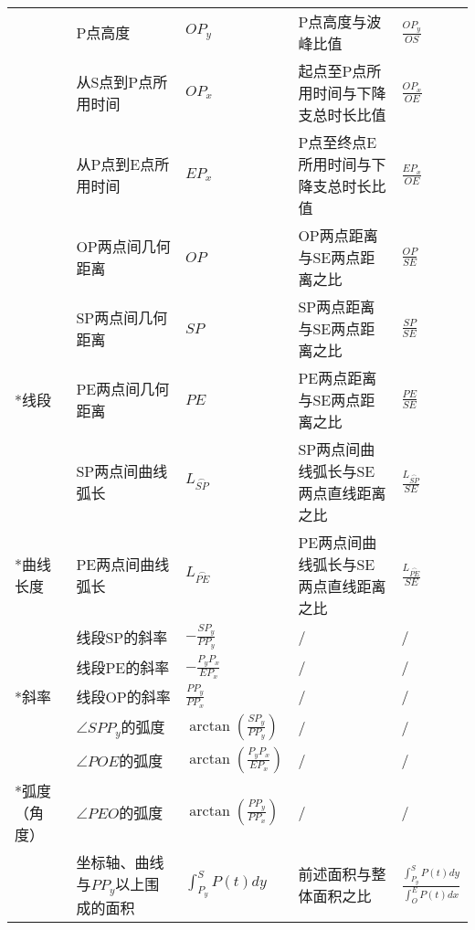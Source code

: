 \begin{center}
\begin{longtable}{m{1.57cm}<{\centering}m{4.07cm}<{\centering}m{2.07cm}<{\centering}m{4.07cm}<{\centering}m{2.67cm}<{\centering}}
                                     & P点高度                  &   $OP_y$       &    P点高度与波峰比值   & $\frac{OP_y}{OS}$ \\
                                     & 从S点到P点所用时间        &    $OP_x$   &      起点至P点所用时间与下降支总时长比值 & $\frac{OP_x}{OE}$ \\
                                     & 从P点到E点所用时间        &    $EP_x$   &      P点至终点E所用时间与下降支总时长比值 & $\frac{EP_x}{OE}$ \\
                                     & OP两点间几何距离        &    $OP$   &  OP两点距离与SE两点距离之比     & $\frac{OP}{SE}$ \\
                                     & SP两点间几何距离        &    $SP$   &  SP两点距离与SE两点距离之比     & $\frac{SP}{SE}$ \\
         \multirow{-7}*{线段}         & PE两点间几何距离        &    $PE$   &  PE两点距离与SE两点距离之比     & $\frac{PE}{SE}$ \\
                                     &  SP两点间曲线弧长     &  $L_{\overset{\frown}{SP}}$     &     SP两点间曲线弧长与SE两点直线距离之比  & $\frac{L_{\overset{\frown}{SP}}}{SE}$ \\
         \multirow{-2}*{曲线长度} &  PE两点间曲线弧长   &   $L_{\overset{\frown}{PE}}$    &    PE两点间曲线弧长与SE两点直线距离之比  &  $\frac{L_{\overset{\frown}{PE}}}{SE}$\\
                                     &  线段SP的斜率     &  $-\frac{SP_y}{PP_y}$     &   /    &  /  \\
                                     &  线段PE的斜率     &   $-\frac{P_yP_x}{EP_x}$    &    /  &  /   \\
         \multirow{-3}*{斜率}        &  线段OP的斜率    &    $\frac{PP_y}{PP_x}$   &    /   &  /     \\
                                     &  $\angle SPP_y$的弧度      & $\arctan(\frac{SP_y}{PP_y})$     &    /  &  /   \\
                                     &   $\angle POE$的弧度    &  $\arctan(\frac{P_yP_x}{EP_x})$      &    /  &  /   \\
         \multirow{-3}*{弧度（角度）}&   $\angle PEO$的弧度   &  $\arctan(\frac{PP_y}{PP_x})$         &    /  &  /   \\
                                     &    坐标轴、曲线与$PP_y$以上围成的面积   &  $\int_{P_y}^{S}{P(t)dy} $     &   前述面积与整体面积之比    & $\frac{\int_{P_y}^{S}{P(t)dy}}{\int_O^E{P(t)dx}}$ \\

\end{longtable}
\end{center}
